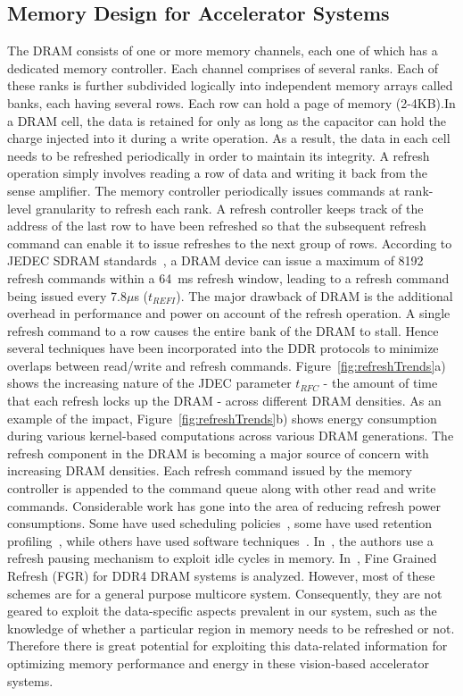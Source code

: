 \subsection{Memory Design for Accelerator Systems}

The DRAM consists of one or more memory channels, each one of which has a dedicated memory controller. Each channel comprises of several ranks. Each of these ranks is further subdivided logically into independent memory arrays called banks, each having several rows. Each row can hold a page of memory (2-4KB).In a DRAM cell, the data is retained for only as long as the capacitor can hold the charge injected into it during a write operation.  As a result, the data in each cell needs to be refreshed periodically in order to maintain its integrity. A refresh operation simply involves reading a row of data and writing it back from the sense amplifier. The memory controller periodically issues commands at rank-level granularity to refresh each rank. A refresh controller keeps track of the address of the last row to have been refreshed so that the subsequent refresh command can enable it to issue refreshes to the next group of rows.
According to JEDEC SDRAM standards~\cite{jedec-sdram-standards}, a DRAM device can issue a maximum of 8192 refresh commands within a 64~ms refresh window, leading to a refresh command being issued every 7.8$\mu$s ($t_{REFI}$). The major drawback of DRAM is the additional overhead in performance and power on account of the refresh operation. A single refresh command to a row causes the entire bank of the DRAM to stall. Hence several techniques have been incorporated into the DDR protocols to minimize overlaps between read/write and refresh commands. Figure~\ref{fig:refreshTrends}a) shows the increasing nature of the JDEC parameter $t_{RFC}$ - the amount of time that each refresh locks up the DRAM - across different DRAM densities. As an example of the impact, Figure~\ref{fig:refreshTrends}b) shows energy consumption during various kernel-based computations across various DRAM generations. The refresh component in the DRAM is becoming a major source of concern with increasing DRAM densities. Each refresh command issued by the memory controller is appended to the command queue along with other read and write commands.  
Considerable work has gone into the area of reducing refresh power consumptions. Some have used scheduling policies~\cite{Stuecheli2010}, some have used retention profiling~\cite{Liu2012}, while others have used software techniques~\cite{Liu2012}. In~\cite{Nair2013}, the authors use a refresh pausing mechanism to exploit idle cycles in memory. In~\cite{Mukundan2013}, Fine Grained Refresh (FGR) for DDR4 DRAM systems is analyzed. 
However, most of these schemes are for a general purpose multicore system. Consequently, they are not geared to exploit the data-specific aspects prevalent in our system, such as the knowledge of whether a particular region in memory needs to be refreshed or not. Therefore there is great potential for exploiting this data-related information for optimizing memory performance and energy in these vision-based accelerator systems.

